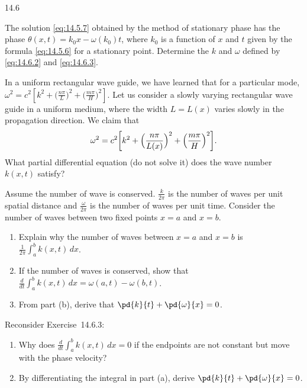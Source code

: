 \begin{exercises}{14.6}
\item[\starred] The solution \eqref{eq:14.5.7} obtained by the method of stationary phase has the phase $\theta(x,t) = k_0 x - \omega(k_0)t$, where $k_0$ is a function of $x$ and $t$ given by the formula \eqref{eq:14.5.6} for a stationary point.  Determine the $k$ and $\omega$ defined by \eqref{eq:14.6.2} and \eqref{eq:14.6.3}.

\item In a uniform rectangular wave guide, we have learned that for a particular mode, $\omega^2 = c^2[k^2 + \bigl(\frac{n\pi}{L}\bigr)^2 + \bigl(\frac{m\pi}{H}\bigr)^2]$.  Let us consider a slowly varying rectangular wave guide in a uniform medium, where the width $L = L(x)$ varies slowly in the propagation direction.  We claim that
\[
\omega^2 = c^2\biggl[k^2 + \Bigl(\frac{n\pi}{L(x)}\Bigr)^2 + \Bigl(\frac{m\pi}{H}\Bigr)^2\biggr].
\]
What partial differential equation (do not solve it) does the wave number $k(x,t)$ satisfy?

\item Assume the number of wave is conserved.  $\frac{k}{2\pi}$ is the number of waves per unit spatial distance and $\frac{\omega}{2\pi}$ is the number of waves per unit time.  Consider the number of waves between two fixed points $x = a$ and $x = b$.
\begin{enumerate}
\item[(a)] Explain why the number of waves between $x = a$ and $x = b$ is $\frac{1}{2\pi}\int_a^b k(x,t)\,dx$.
\item[(b)] If the number of waves is conserved, show that $\frac{d}{d t}\int_a^b k(x,t)\,dx = \omega(a,t) - \omega(b,t)$.
\item[(c)] From part (b), derive that $\pd{k}{t} + \pd{\omega}{x} = 0$.
\end{enumerate}

\item Reconsider Exercise~14.6.3:
\begin{enumerate}
\item[(a)] Why does $\frac{d}{d t}\int_a^b k(x,t)\,dx = 0$ if the endpoints are not constant but move with the phase velocity?
\item[(b)] By differentiating the integral in part (a), derive $\pd{k}{t} + \pd{\omega}{x} = 0$.
\end{enumerate}


\end{exercises}
